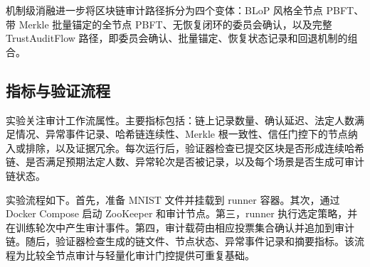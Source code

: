 机制级消融进一步将区块链审计路径拆分为四个变体：BLoP 风格全节点 PBFT、带 Merkle 批量锚定的全节点 PBFT、无恢复闭环的委员会确认，以及完整 TrustAuditFlow 路径，即委员会确认、批量锚定、恢复状态记录和回退机制的组合。

\subsection{指标与验证流程}

实验关注审计工作流属性。主要指标包括：链上记录数量、确认延迟、法定人数满足情况、异常事件记录、哈希链连续性、Merkle 根一致性、信任门控下的节点纳入或排除，以及证据冗余。每次运行后，验证器检查已提交区块是否形成连续哈希链、是否满足预期法定人数、异常轮次是否被记录，以及每个场景是否生成可审计链状态。

实验流程如下。首先，准备 MNIST 文件并挂载到 runner 容器。其次，通过 Docker Compose 启动 ZooKeeper 和审计节点。第三，runner 执行选定策略，并在训练轮次中产生审计事件。第四，审计载荷由相应投票集合确认并追加到审计链。随后，验证器检查生成的链文件、节点状态、异常事件记录和摘要指标。该流程为比较全节点审计与轻量化审计门控提供可重复基础。
